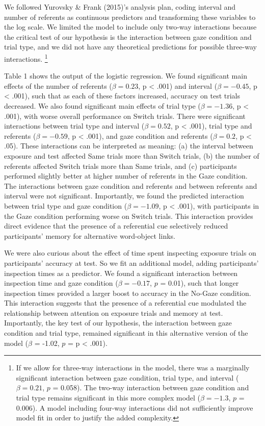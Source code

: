 \documentclass[authoryear, review]{elsarticle}
\begin{document}
We followed Yurovsky \& Frank (2015)'s analysis plan, coding interval
and number of referents as continuous predictors and transforming these
variables to the log scale. We limited the model to include only two-way
interactions because the critical test of our hypothesis is the
interaction between gaze condition and trial type, and we did not have
any theoretical predictions for possible three-way interactions.
\footnote{If we allow for three-way interactions in the model, there was a marginally significant interaction between gaze condition, trial type, and interval ($\beta = 0.21$, $p$ = 0.058). The two-way interaction between gaze condition and trial type remains significant in this more complex model ($\beta = -1.3$, $p$ = 0.006). A model including four-way interactions did not sufficiently improve model fit in order to justify the added complexity.}

Table 1 shows the output of the logistic regression. We found
significant main effects of the number of referents (\(\beta = 0.23\), p
\textless{} .001) and interval (\(\beta = -0.45\), p \textless{} .001),
such that as each of these factors increased, accuracy on test trials
decreased. We also found significant main effects of trial type
(\(\beta = -1.36\), p \textless{} .001), with worse overall performance
on Switch trials. There were significant interactions between trial type
and interval (\(\beta = 0.52\), p \textless{} .001), trial type and
referents (\(\beta = -0.59\), p \textless{} .001), and gaze condition
and referents (\(\beta = 0.2\), p \textless{} .05). These interactions
can be interpreted as meaning: (a) the interval between exposure and
test affected Same trials more than Switch trials, (b) the number of
referents affected Switch trials more than Same trials, and (c)
participants performed slightly better at higher number of referents in
the Gaze condition. The interactions between gaze condition and
referents and between referents and interval were not significant.
Importantly, we found the predicted interaction between trial type and
gaze condition (\(\beta = -1.09\), p \textless{} .001), with
participants in the Gaze condition performing worse on Switch trials.
This interaction provides direct evidence that the presence of a
referential cue selectively reduced participants' memory for alternative
word-object links.

We were also curious about the effect of time spent inspecting exposure
trials on participants' accuracy at test. So we fit an additional model,
adding participants' inspection times as a predictor. We found a
significant interaction between inspection time and gaze condition
(\(\beta = -0.17\), \(p\) = 0.01), such that longer inspection times
provided a larger boost to accuracy in the No-Gaze condition. This
interaction suggests that the presence of a referential cue modulated
the relationship between attention on exposure trials and memory at
test. Importantly, the key test of our hypothesis, the interaction
between gaze condition and trial type, remained significant in this
alternative version of the model (\(\beta\) = -1.02, \(p\) = p
\textless{} .001).
\end{document}
